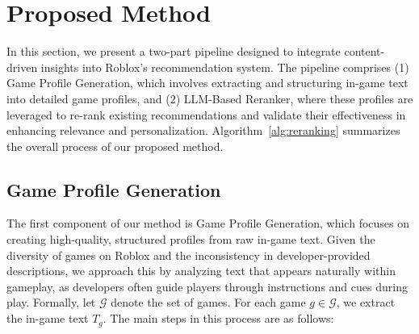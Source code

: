 


\section{Proposed Method}
In this section, we present a two-part pipeline designed to integrate content-driven insights into Roblox’s recommendation system. The pipeline comprises (1) Game Profile Generation, which involves extracting and structuring in-game text into detailed game profiles, and (2) LLM-Based Reranker, where these profiles are leveraged to re-rank existing recommendations and validate their effectiveness in enhancing relevance and personalization. Algorithm~\ref{alg:reranking} summarizes the overall process of our proposed method.


\subsection{Game Profile Generation}
The first component of our method is Game Profile Generation, which focuses on creating high-quality, structured profiles from raw in-game text. Given the diversity of games on Roblox and the inconsistency in developer-provided descriptions, we approach this by analyzing text that appears naturally within gameplay, as developers often guide players through instructions and cues during play. Formally, let $\mathcal{G}$ denote the set of games. For each game $g \in \mathcal{G}$, we extract the in-game text $T_g$. The main steps in this process are as follows:


